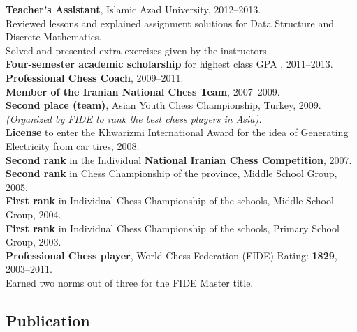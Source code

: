 \documentclass[10pt]{article}
\begin{document}
\noindent\textbf{Teacher’s Assistant}, Islamic Azad University, 2012--2013.\\
\indent Reviewed lessons and explained assignment solutions for Data Structure and Discrete Mathematics.\\
\indent Solved and presented extra exercises given by the instructors. \vspace{0.5mm}\\
\textbf{Four-semester academic scholarship} for highest class GPA , 2011--2013. \vspace{0.5mm}\\
\noindent\textbf {Professional Chess Coach}, 2009--2011. \vspace{0.5mm}\\
\noindent\textbf {Member of the Iranian National Chess Team}, 2007--2009. \vspace{0.5mm}\\
\textbf{Second place (team)}, Asian Youth Chess Championship, Turkey, 2009.\\ \indent \textit {(Organized by FIDE  to rank the best chess players in Asia).} \vspace{0.5mm} \\
\noindent\textbf {License }to enter the Khwarizmi International Award for the idea of Generating Electricity from car tires, 2008. \vspace{0.5mm}\\
\textbf{Second rank} in the Individual \textbf{National Iranian Chess Competition}, 2007. \vspace{0.5mm}\\
\textbf{Second rank} in Chess Championship of the province, Middle School Group, 2005. \vspace{0.5mm}\\
\textbf{First rank} in Individual Chess Championship of the schools, Middle School Group, 2004. \vspace{0.5mm}\\
\textbf{First rank} in Individual Chess Championship of the schools, Primary School Group, 2003. \vspace{0.5mm}\\
\noindent\textbf {Professional Chess player},  World Chess Federation (FIDE) Rating:  \textbf{1829}, 2003--2011.\\ \indent Earned two norms out of three for the FIDE Master title. 

\subsection*{Publication}
\end{document}
